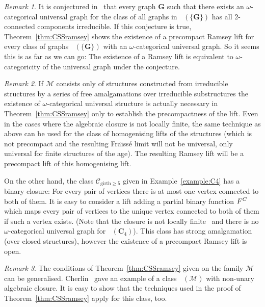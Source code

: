 \documentclass{elsarticle}
\def\Forbm{\mathop{\mathrm{Forb_m}}\nolimits}
\def\str#1{\mathbf {#1}}
\def\func#1#2{\nbfunc{\ifstrempty{#1}{}{\str{#1}}}{#2}}
\def\nbfunc#1#2{F\ifstrempty{#1}{}{_{#1}}\ifstrempty{#2}{}{^{#2}}}
\def\Fraisse{Fra\"{\i}ss\' e}
\theoremstyle{plain}
\theoremstyle{definition}
\theoremstyle{remark}
\newtheorem*{remark}{Remark}
\begin{document}
\begin{remark}
It is conjectured in~\cite{Cherlin2015,Cherlin2011} that every graph $\str{G}$
such that there exists an $\omega$-categorical universal graph for the class of all graphs in $\Forbm(\{\str{G}\})$ has all 2-connected components irreducible.
If this conjecture is true, Theorem~\ref{thm:CSSramsey} shows the existence
of a precompact Ramsey lift for every class of graphs $\Forbm(\{\str{G}\})$ with an
$\omega$-categorical universal graph. So it seems this is as far as we can go: The existence of a Ramsey lift is equivalent to $\omega$-categoricity of the universal graph under the conjecture.
\end{remark}

\begin{remark}
If $\mathcal M$ consists only of structures constructed from
irreducible structures by a series of free amalgamations over irreducible
substructures the existence of $\omega$-categorical universal structure is
actually necessary in Theorem~\ref{thm:CSSramsey} only to establish the
precompactness of the lift.  Even in the cases where the algebraic closure is not
locally finite, the same technique as above can be used for the class of
homogenising lifts of the structures (which is not precompact and the resulting
\Fraisse{} limit will not be universal, only universal for finite structures of
the age). The resulting Ramsey lift will be a precompact lift of this
homogenising lift. 


On the other hand, the class $\mathcal C_{\mathrm{girth}\geq 5}$ given in Example~\ref{example:C4}
has a binary closure:
For every pair of vertices there is at most one vertex connected to
both of them. It is easy to consider a lift adding a partial binary function
$\func{}{C}$  which maps every pair of vertices to the unique vertex connected to both of them if such a vertex exists.
(Note that the closure is not locally finite~\cite{Fueredi1997} and there is no
$\omega$-categorical universal graph for $\Forbm(\str{C}_4)$).  This class has
strong amalgamation (over closed structures), however the existence of a precompact Ramsey lift
is open.
\end{remark}
\begin{remark}
The conditions of Theorem~\ref{thm:CSSramsey} given on the family $\mathcal M$ can be
generalised. Cherlin~\cite{Cherlin2011} gave an example of a class $\Forbm(\mathcal M)$
with non-unary algebraic closure. It is easy to show that the techniques
used in the proof of Theorem~\ref{thm:CSSramsey} apply for this class, too.
\end{remark}
\end{document}
